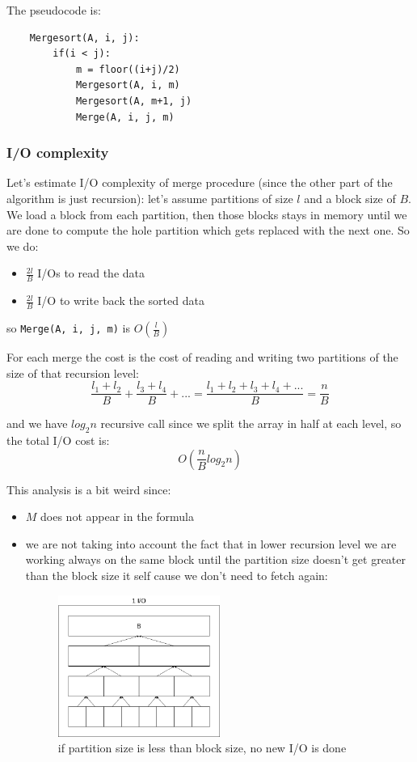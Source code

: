 The pseudocode is:
\begin{verbatim}
    Mergesort(A, i, j):
        if(i < j):
            m = floor((i+j)/2)
            Mergesort(A, i, m)
            Mergesort(A, m+1, j)
            Merge(A, i, j, m)
\end{verbatim}

\subsubsection{I/O complexity}
Let's estimate I/O complexity of merge procedure (since the other part of the algorithm is just recursion): let's assume partitions of size $l$ and a block size of $B$.
We load a block from each partition, then those blocks stays in memory until we are done to compute the hole partition which gets replaced with the next one.
So we do:
\begin{itemize}
    \item $\frac{2l}{B}$ I/Os to read the data
    \item $\frac{2l}{B}$ I/O to write back the sorted data
\end{itemize}
so \verb|Merge(A, i, j, m)| is $O\left(\frac{l}{B}\right)$

For each merge the cost is the cost of reading and writing two partitions of the size of that recursion level:
$$
    \frac{l_1 + l_2}{B} + \frac{l_3 + l_4}{B} + ... = \frac{l_1 + l_2 + l_3 + l_4 + ...}{B} = \frac{n}{B}
$$

and we have $log_2 n$ recursive call since we split the array in half at each level, so the total I/O cost is:
$$
    O\left( \frac{n}{B} log_2 n \right)
$$

This analysis is a bit weird since:
\begin{itemize}
    \item $M$ does not appear in the formula
    \item we are not taking into account the fact that in lower recursion level we are working always on the same block until the partition size doesn't get greater than the block size it self cause we don't need to fetch again:
    \begin{figure}[H]
        \centering
        \includegraphics[width=200px]{images/1_Introduction/block_optimization.png}
        \caption{if partition size is less than block size, no new I/O is done}
    \end{figure}
\end{itemize}

